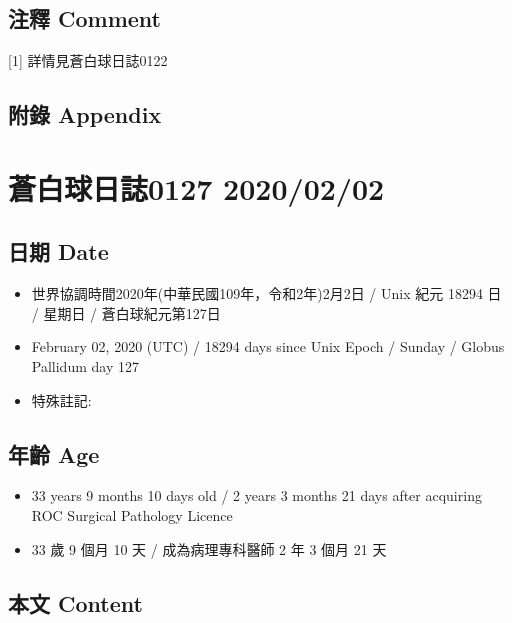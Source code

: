 \documentclass[
]{article}
\providecommand{\tightlist}{%
  \setlength{\itemsep}{0pt}\setlength{\parskip}{0pt}}
\begin{document}
\hypertarget{ux6ce8ux91cb-comment}{%
\subsection{注釋 Comment}\label{ux6ce8ux91cb-comment}}

{[}1{]} 詳情見蒼白球日誌0122

\hypertarget{ux9644ux9304-appendix}{%
\subsection{附錄 Appendix}\label{ux9644ux9304-appendix}}

\hypertarget{ux84bcux767dux7403ux65e5ux8a8c0127-20200202}{%
\section{蒼白球日誌0127
2020/02/02}\label{ux84bcux767dux7403ux65e5ux8a8c0127-20200202}}

\hypertarget{ux65e5ux671f-date-1}{%
\subsection{日期 Date}\label{ux65e5ux671f-date-1}}

\begin{itemize}
\tightlist
\item
  世界協調時間2020年(中華民國109年，令和2年)2月2日 / Unix 紀元 18294 日
  / 星期日 / 蒼白球紀元第127日
\item
  February 02, 2020 (UTC) / 18294 days since Unix Epoch / Sunday /
  Globus Pallidum day 127
\item
  特殊註記:
\end{itemize}

\hypertarget{ux5e74ux9f61-age-1}{%
\subsection{年齡 Age}\label{ux5e74ux9f61-age-1}}

\begin{itemize}
\tightlist
\item
  33 years 9 months 10 days old / 2 years 3 months 21 days after
  acquiring ROC Surgical Pathology Licence
\item
  33 歲 9 個月 10 天 / 成為病理專科醫師 2 年 3 個月 21 天
\end{itemize}

\hypertarget{ux672cux6587-content-1}{%
\subsection{本文 Content}\label{ux672cux6587-content-1}}
\end{document}
